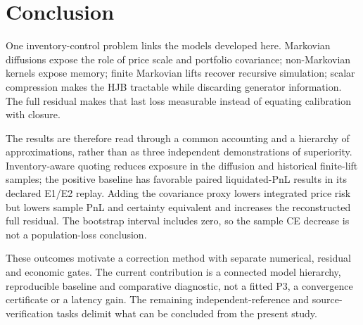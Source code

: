 \chapter*{Conclusion}
One inventory-control problem links the models developed here. Markovian diffusions expose the role of price scale and portfolio covariance; non-Markovian kernels expose memory; finite Markovian lifts recover recursive simulation; scalar compression makes the HJB tractable while discarding generator information. The full residual makes that last loss measurable instead of equating calibration with closure.

The results are therefore read through a common accounting and a hierarchy of approximations, rather than as three independent demonstrations of superiority. Inventory-aware quoting reduces exposure in the diffusion and historical finite-lift samples; the positive baseline has favorable paired liquidated-PnL results in its declared E1/E2 replay. Adding the covariance proxy lowers integrated price risk but lowers sample PnL and certainty equivalent and increases the reconstructed full residual. The bootstrap interval includes zero, so the sample CE decrease is not a population-loss conclusion.

These outcomes motivate a correction method with separate numerical, residual and economic gates. The current contribution is a connected model hierarchy, reproducible baseline and comparative diagnostic, not a fitted P3, a convergence certificate or a latency gain. The remaining independent-reference and source-verification tasks delimit what can be concluded from the present study.
